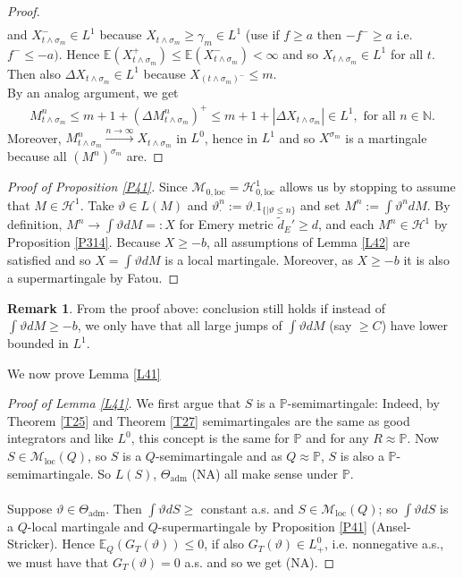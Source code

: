\documentclass[12pt,a4paper, twoside]{article}
\theoremstyle{definition}
\newtheorem{rem}{Remark}[section]
\newcommand{\EE}{\mathbb{E}} %
\newcommand{\PP}{\mathbb{P}} %
\begin{document}
\begin{proof}
\begin{align*}
\end{align*}
and $X_{t \wedge \sigma_m}^- \in L^1$ because $X_{t \wedge \sigma_m} \geq \gamma_m \in L^1$ (use if $f \geq a$ then $-f^{-} \geq a$ i.e. $f^{-} \leq -a)$. Hence $\EE( X_{t \wedge \sigma_m}^+) \leq \EE( X_{t \wedge \sigma_m}^-) < \infty$ and so $X_{t \wedge \sigma_m} \in L^1$ for all $t$. Then also $\Delta X_{t \wedge \sigma_m} \in L^1$ because $X_{( t \wedge \sigma_m)^-} \leq m$.  \\
By an analog argument, we get 
\begin{align*}
M_{t \wedge \sigma_m}^n \leq m+1 + ( \Delta M_{t \wedge \sigma_m}^n)^+ \leq m+1 + | \Delta X_{t \wedge \sigma_m}| \in L^1, \text{ for all } n \in \mathbb{N}.
\end{align*}
Moreover, $M_{t \wedge \sigma_m}^n \xrightarrow{n \to \infty} X_{t \wedge \sigma_m}$ in $L^0$, hence in $L^1$ and so $X^{\sigma_m}$ is a martingale because all $(M^n)^{\sigma_m}$ are. 
\end{proof}
\newpage
\begin{proof}[Proof of Proposition \ref{P41}] Since $\mathcal{M}_{0, \text{loc}} = \mathcal{H}_{0, \text{loc}}^1$ allows us by stopping to assume that $M \in \mathcal{H}^1$. Take $\vartheta \in L(M)$ and $\vartheta_\cdot^n := \vartheta_\cdot 1_{\{ | \vartheta \leq n \}}$ and set $M^n:= \int \vartheta^n d M$. By definition, $M^n \to \int \vartheta dM =: X$ for Emery metric $\widetilde{d}_E' \geq d$, and each $M^n \in \mathcal{H}^1$ by Proposition \ref{P314}. Because $X \geq -b$, all assumptions of Lemma \ref{L42} are satisfied and so $X= \int \vartheta dM$ is a local martingale. Moreover, as $X \geq -b$ it is also a supermartingale by Fatou. 
\end{proof}
\begin{rem} From the proof above: conclusion still holds if instead of $\int \vartheta dM \geq -b$, we only have that all large jumps of $\int \vartheta dM$ (say $\geq C$) have lower bounded in $L^1$. 
\end{rem}
We now prove Lemma \ref{L41}
\begin{proof}[Proof of Lemma \ref{L41}] We first argue that $S$ is a $\PP$-semimartingale: Indeed, by Theorem \ref{T25} and Theorem \ref{T27} semimartingales are the same as good integrators and like $L^0$, this concept is the same for $\PP$ and for any $R \approx \PP$. Now $S \in \mathcal{M}_\text{loc}(Q)$, so $S$ is a $Q$-semimartingale and as $Q \approx \PP$, $S$ is also a $\PP$-semimartingale. So $L(S)$, $\Theta_\text{adm}$ (NA) all make sense under $\PP$. 
\\\\
Suppose $\vartheta \in \Theta_\text{adm}$. Then $ \int \vartheta dS \geq$ constant a.s. and $S \in \mathcal{M}_\text{loc}(Q)$; so $\int \vartheta dS$ is a $Q$-local martingale and $Q$-supermartingale by Proposition \ref{P41} (Ansel-Stricker). Hence $\EE_Q(G_T( \vartheta)) \leq 0$, if also $G_T( \vartheta) \in L_+^0$, i.e. nonnegative a.s., we must have that $G_T( \vartheta)=0$ a.s. and so we get (NA).
\end{proof}
\end{document}
